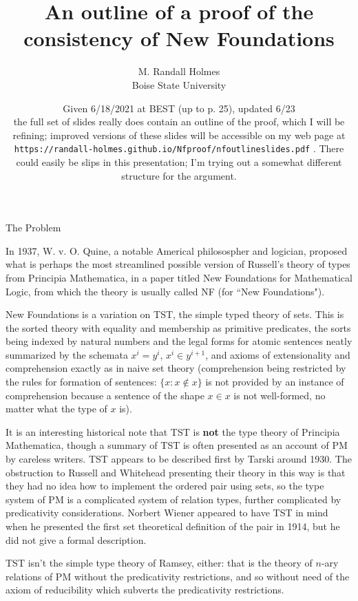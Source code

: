 \documentclass{slides}
\author{M. Randall Holmes\\Boise State University}
\title{An outline of a proof of the consistency of New Foundations}
\date{Given 6/18/2021 at BEST (up to p. 25), updated 6/23\\
the full set of slides really does contain an outline of the proof, which I will be refining;  improved versions of these slides will be accessible on my web page at
{\tiny {\tt https://randall-holmes.github.io/Nfproof/nfoutlineslides.pdf}}
.  There could easily be slips in this presentation;  I'm trying out a somewhat different structure for the argument.}
\begin{document}
\begin{slide}

\maketitle

\end{slide}

\begin{slide}


{\Large The Problem}

In 1937, W. v. O. Quine, a notable Americal philosospher and logician, proposed what is perhaps the most streamlined possible version of Russell's theory of types from Principia Mathematica, in a paper titled New Foundations for Mathematical Logic, from which the theory is usually called NF (for ``New Foundations").



\end{slide}

\begin{slide}

New Foundations is a variation on TST, the simple typed theory of sets.  This is the sorted theory with equality and membership as primitive predicates, the sorts being indexed by natural numbers and the legal forms for atomic sentences neatly summarized by the schemata $x^i = y^i$, $x^i \in y^{i+1}$, and axioms of extensionality and comprehension exactly as in naive set theory (comprehension being restricted by the rules for formation of sentences:  $\{x:x \not\in x\}$ is not provided by an instance of comprehension because a sentence of the shape
$x \in x$ is not well-formed, no matter what the type of $x$ is).

\end{slide}

\begin{slide}

It is an interesting historical note that TST is {\bf not} the type theory of Principia Mathematica, though a summary of TST is often presented as an account of PM by careless writers.  TST appears to be described first by  Tarski around 1930.  The obstruction to Russell and Whitehead presenting their theory in this way is that they had no idea how to implement the ordered pair using sets, so the type system of PM is a complicated system of relation types, further complicated by predicativity considerations.  Norbert Wiener appeared to have TST in mind when he presented the first set theoretical definition of the pair in 1914, but he did not give a formal description.

TST isn't the simple type theory of Ramsey, either:  that is the theory of $n$-ary relations of PM without the predicativity restrictions, and so without need of the axiom of reducibility which subverts the predicativity restrictions.

\end{slide}
\end{document}
